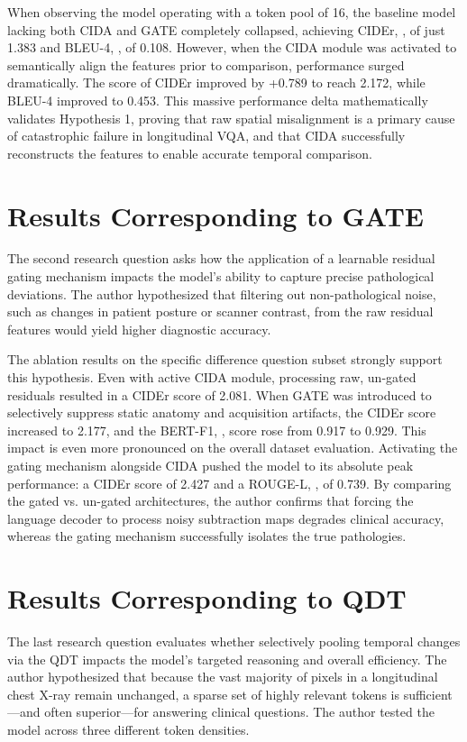 When observing the model operating with a token pool of 16, the baseline model lacking both CIDA and GATE completely collapsed, achieving CIDEr, \cite{cider},  of just 1.383 and BLEU-4, \cite{bleu}, of 0.108. However, when the CIDA module was activated to semantically align the features prior to comparison, performance surged dramatically. The score of CIDEr improved by +0.789 to reach 2.172, while BLEU-4 improved to 0.453. This massive performance delta mathematically validates Hypothesis 1, proving that raw spatial misalignment is a primary cause of catastrophic failure in longitudinal VQA, and that CIDA successfully reconstructs the features to enable accurate temporal comparison.

\section{Results Corresponding to GATE}
The second research question asks how the application of a learnable residual gating mechanism impacts the model's ability to capture precise pathological deviations. The author hypothesized that filtering out non-pathological noise, such as changes in patient posture or scanner contrast, from the raw residual features would yield higher diagnostic accuracy.

The ablation results on the specific difference question subset strongly support this hypothesis. Even with active CIDA module, processing raw, un-gated residuals resulted in a CIDEr score of 2.081. When GATE was introduced to selectively suppress static anatomy and acquisition artifacts, the CIDEr score increased to 2.177, and the BERT-F1, \cite{bert-score}, score rose from 0.917 to 0.929. This impact is even more pronounced on the overall dataset evaluation. Activating the gating mechanism alongside CIDA pushed the model to its absolute peak performance: a CIDEr score of 2.427 and a ROUGE-L, \cite{rouge}, of 0.739. By comparing the gated vs. un-gated architectures, the author confirms that forcing the language decoder to process noisy subtraction maps degrades clinical accuracy, whereas the gating mechanism successfully isolates the true pathologies.

\section{Results Corresponding to QDT}
The last research question evaluates whether selectively pooling temporal changes via the QDT impacts the model's targeted reasoning and overall efficiency. The author hypothesized that because the vast majority of pixels in a longitudinal chest X-ray remain unchanged, a sparse set of highly relevant tokens is sufficient—and often superior—for answering clinical questions. The author tested the model across three different token densities.

